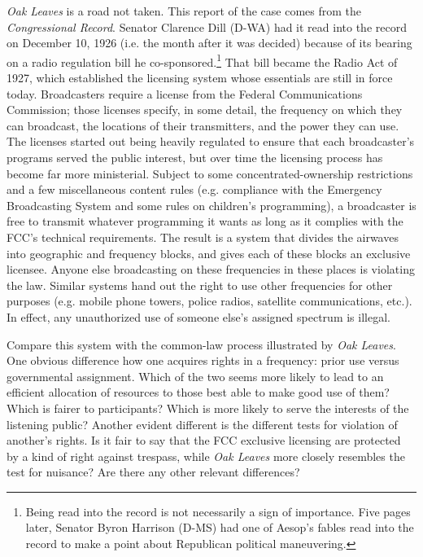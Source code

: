 

\item \textit{Oak Leaves} is a road not taken. This report of the case comes
from the \textit{Congressional Record}. Senator Clarence Dill (D-WA) had it
read into the record on December 10, 1926 (i.e. the month after it was decided)
because of its bearing on a radio regulation bill he
co-sponsored.\footnote{Being read into the record is not necessarily a sign of
importance. Five pages
later, Senator Byron Harrison (D-MS) had one of Aesop's fables read into the
record to make a point about Republican political maneuvering.} That bill
became the Radio Act of 1927, which established the licensing system whose
essentials are still in force today. Broadcasters require a license from the
Federal Communications Commission; those licenses specify, in some detail, the
frequency on which they can broadcast, the locations of their transmitters, and
the power they can use. The licenses started out being heavily regulated to
ensure that each broadcaster's programs served the public interest, but over
time the licensing process has become far more ministerial. Subject to some
concentrated-ownership restrictions and a few miscellaneous content rules (e.g.
compliance with the Emergency Broadcasting System and some rules on children's
programming), a broadcaster is free to transmit whatever programming it wants
as long as it complies with the FCC's technical requirements. The result is a
system that divides the airwaves into geographic and frequency blocks, and
gives each of these blocks an exclusive licensee. Anyone else broadcasting on
these frequencies in these places is violating the law.  Similar systems hand
out the right to use other frequencies for other purposes (e.g. mobile phone
towers, police radios, satellite communications, etc.). In effect, any
unauthorized use of someone else's assigned spectrum is illegal.

Compare this system with the common-law process illustrated by \textit{Oak
Leaves}. One obvious difference how one acquires rights in a frequency: prior
use versus governmental assignment. Which of the two seems more likely to lead
to an efficient allocation of resources to those best able to make good use of
them? Which is fairer to participants? Which is more likely to serve the
interests of the listening public? Another evident different is the different
tests for violation of another's rights. Is it fair to say that the FCC
exclusive licensing are protected by a kind of right against trespass, while
\textit{Oak Leaves} more closely resembles the test for nuisance? Are there any
other relevant differences?

